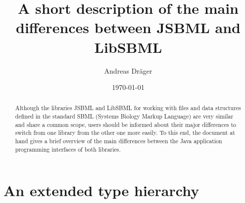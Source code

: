 \documentclass[
  letterpaper,
  12pt,
  headsepline,
  pointlessnumbers,
  tablecaptionabove,
  headinclude,
  appendixprefix,
  idxtotoc,
  bibtotoc
]{scrartcl}
\title{A short description of the main differences between JSBML and LibSBML}
\author{Andreas Dr\"ager}
\date{\today}
\begin{document}
\maketitle

\begin{abstract}
Although the libraries JSBML and LibSBML for working with files and data structures 
defined in the standard SBML (Systems Biology Markup Language) are very similar and 
share a common scope, users should be informed about their major differences to 
switch from one library from the other one more easily. To this end, the document at
hand gives a brief overview of the main differences between the Java\texttrademark{} 
application programming interfaces of both libraries.
\end{abstract}

\section{An extended type hierarchy}
\end{document}
